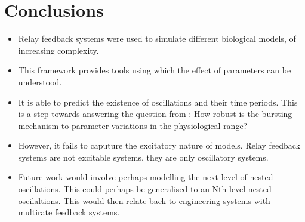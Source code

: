 \documentclass[a4paper, 12pt]{article}
\begin{document}
\section{Conclusions}
\begin{itemize}
\item Relay feedback systems were used to simulate different biological models, of increasing complexity. 
\item This framework provides tools using which the effect of parameters can be understood.
\item It is able to predict the existence of oscillations and their time periods. This is a step towards answering the question from \cite{rinzel}: How robust is the bursting mechanism to parameter variations in the physiological range? 
\item However, it fails to caputure the excitatory nature of models. Relay feedback systems are not excitable systems, they are only oscillatory systems.
\item Future work would involve perhaps modelling the next level of nested oscillations. This could perhaps be generalised to an Nth level nested oscilaltions. This would then relate back to engineering systems with multirate feedback systems. 
\end{itemize}
\end{document}
